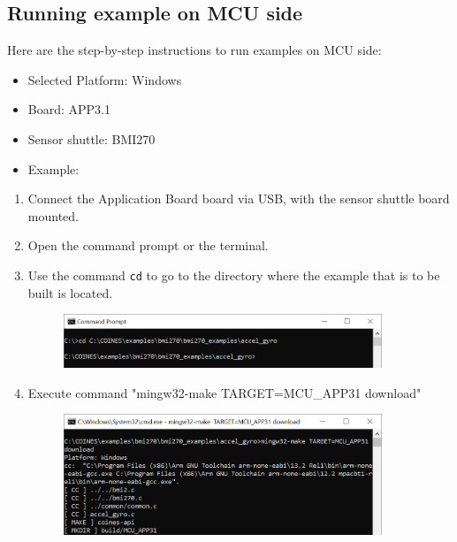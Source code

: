 \documentclass[11pt,headings=small]{scrartcl}
\begin{document}
\subsection{Running example on MCU side}
Here are the step-by-step instructions to run examples on MCU side:
\begin{itemize}
	\item Selected Platform: Windows
	\item Board: APP3.1
	\item Sensor shuttle: BMI270
	\item Example: 
\end{itemize}
\begin{enumerate}
	\item Connect the Application Board board via USB, with the sensor shuttle board mounted.
	\item Open the command prompt or the terminal.
	\item Use the command \texttt{cd} to go to the directory where the example that is to be built is located.
	\begin{figure}[H]
		\begin{center}
			\includegraphics[width=0.9\textwidth]{coinesAPI_images/Mcu_example_cd.png}
		\end{center}
	\end{figure}
	\item Execute command "mingw32-make TARGET=MCU\_APP31 download"
	\begin{figure}[H]
		\begin{center}
			\includegraphics[width=0.9\textwidth]{coinesAPI_images/Mcu_example_compile.png}
		\end{center}
	\end{figure}
	\begin{figure}[H]

\end{figure}
\end{enumerate}
\end{document}
